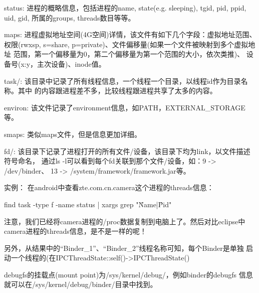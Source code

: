 \documentclass[a4paper,11pt]{article}
\begin{document}
  status: 进程的概略信息，包括进程的name, state(e.g. sleeping), tgid, pid, ppid,
  uid, gid, 所属的groups, threads数目等等。

  maps: 进程虚拟地址空间(4G空间)详情，该文件有如下几个字段：虚拟地址范围、
  权限(rwxsp, s=share, p=private)、文件偏移量(如果一个文件被映射到多个虚拟地址
  范围，第一个偏移量为0，第二个偏移量为第一个范围的大小，依次类推)、
  设备号(x:y，主次设备)、inode值。

  task/: 该目录中记录了所有线程信息，一个线程一个目录，以线程id作为目录名称。其中
  的内容跟进程差不多，比较线程跟进程共享了太多的内容。

  environ: 该文件记录了environment信息，如PATH，EXTERNAL\_STORAGE等。

  smaps: 类似maps文件，但是信息更加详细。

  fd/: 该目录下记录了进程打开的所有文件/设备，该目录下均为link，以文件描述符号命名，
  通过ls -l可以看到每个fd关联到那个文件/设备，如：9 -> /dev/binder、
  13 -> /system/framework/framework.jar等。

  \vspace{5pt}

  实例：
  在android中查看zte.com.cn.camera这个进程的threads信息：

  find task -type f -name status | xargs grep "\^Name\bs|\^Pid"

  注意，我们已经将camera进程的/proc数据复制到电脑上了。然后对比eclipse中
  camera进程的threads信息，是不是一样的呢！

  另外，从结果中的“Binder\_1”、“Binder\_2”线程名称可知，每个Binder是单独
  启动一个线程的(在IPCThreadState::self()->IPCThreadState()

  debugfs的挂载点(mount point)为/sys/kernel/debug/，例如binder的debugfs
  信息就可以在/sys/kernel/debug/binder/目录中找到。


\end{document}
